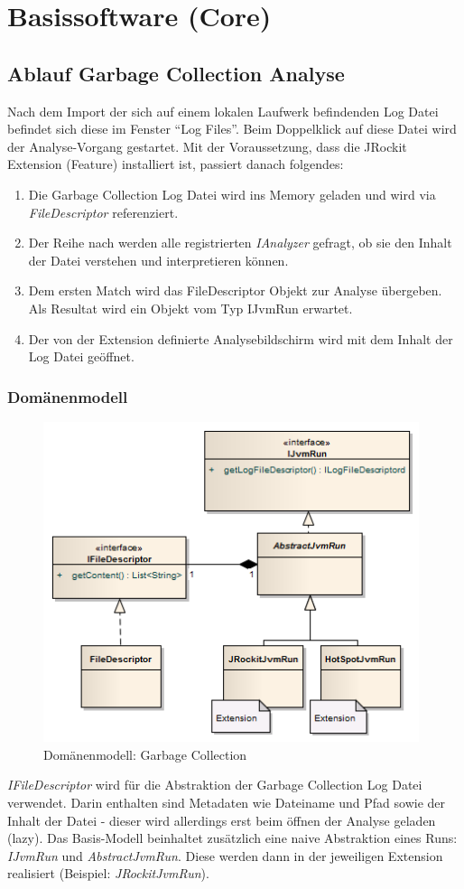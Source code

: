 \section{Basissoftware (Core)}
\subsection{Ablauf Garbage Collection Analyse}
Nach dem Import der sich auf einem lokalen Laufwerk befindenden Log Datei befindet sich diese im Fenster ``Log Files''. Beim Doppelklick auf diese Datei wird der Analyse-Vorgang gestartet. Mit der Voraussetzung, dass die JRockit Extension (Feature) installiert ist, passiert danach folgendes:
\begin{enumerate}
	\item Die Garbage Collection Log Datei wird ins Memory geladen und wird via \textit{FileDescriptor} referenziert.
	\item Der Reihe nach werden alle registrierten \textit{IAnalyzer} gefragt, ob sie den Inhalt der Datei verstehen und interpretieren können. 
	\item Dem ersten Match wird das FileDescriptor Objekt zur Analyse übergeben. Als Resultat wird ein Objekt vom Typ IJvmRun erwartet. 
	\item Der von der Extension definierte Analysebildschirm wird mit dem Inhalt der Log Datei geöffnet.
\end{enumerate}
\subsubsection{Domänenmodell}
 \begin{figure}[H]
  	\centering
        	\caption{Domänenmodell: Garbage Collection}
    	\includegraphics[width=11cm]{images/core_domain}
\end{figure}
\textit{IFileDescriptor} wird für die Abstraktion der Garbage Collection Log Datei verwendet. Darin enthalten sind Metadaten wie Dateiname und Pfad sowie der Inhalt der Datei - dieser wird allerdings erst beim öffnen der Analyse geladen (lazy). Das Basis-Modell beinhaltet zusätzlich eine naive Abstraktion eines Runs: \textit{IJvmRun} und \textit{AbstractJvmRun}. Diese werden dann in der jeweiligen Extension realisiert (Beispiel: \textit{JRockitJvmRun}). 

